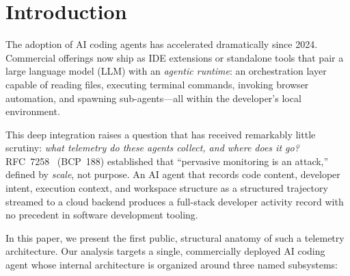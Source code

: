\documentclass[sigconf,anonymous]{acmart}
\begin{document}


\maketitle

\section{Introduction}\label{sec:intro}

The adoption of AI coding agents has accelerated dramatically since
2024.  Commercial offerings now ship as IDE extensions or standalone
tools that pair a large language model (LLM) with an \emph{agentic
runtime}: an orchestration layer capable of reading files, executing
terminal commands, invoking browser automation, and spawning
sub-agents---all within the developer's local environment.

This deep integration raises a question that has received remarkably
little scrutiny: \emph{what telemetry do these agents collect, and
where does it go?}  RFC~7258~\cite{rfc7258} (BCP~188) established
that ``pervasive monitoring is an attack,'' defined by \emph{scale},
not purpose.  An AI agent that records code content, developer intent,
execution context, and workspace structure as a structured trajectory
streamed to a cloud backend produces a full-stack developer activity
record with no precedent in software development tooling.

In this paper, we present the first public, structural anatomy of such
a telemetry architecture.  Our analysis targets a single, commercially
deployed AI coding agent whose internal architecture is organized
around three named subsystems:
\end{document}
